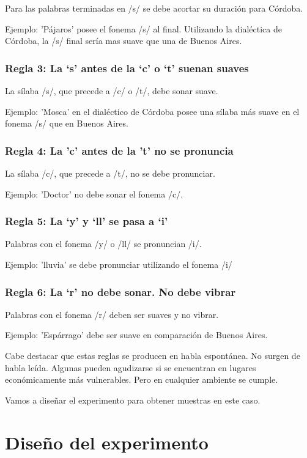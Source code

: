 \documentclass[11pt,a4paper,twoside]{tesis}
\begin{document}
Para las palabras terminadas en /s/ se debe acortar su duración para Córdoba. 

Ejemplo: 'Pájaros' posee el fonema /s/ al final. Utilizando la dialéctica de Córdoba, la /s/ final sería mas suave que una de Buenos Aires. 

\subsection*{Regla 3: La ‘s’ antes de la ‘c’ o ‘t’ suenan suaves}

La sílaba /s/, que precede a /c/ o /t/, debe sonar suave. 

Ejemplo: 'Mosca' en el dialéctico de Córdoba posee una sílaba más suave en el fonema /s/ que en Buenos Aires. 

\subsection*{Regla 4: La 'c' antes de la 't' no se pronuncia}

La sílaba /c/, que precede a /t/, no se debe pronunciar. 

Ejemplo: 'Doctor' no debe sonar el fonema /c/.

\subsection*{Regla 5: La ‘y’ y ‘ll’ se pasa a ‘i’}

Palabras con el fonema /y/ o /ll/ se pronuncian /i/. 


Ejemplo: 'lluvia' se debe pronunciar utilizando el fonema /i/ 

\subsection*{Regla 6: La ‘r’ no debe sonar. No debe vibrar}

Palabras con el fonema /r/ deben ser suaves y no vibrar. 

Ejemplo: 'Espárrago' debe ser suave en comparación de Buenos Aires. 

Cabe destacar que estas reglas se producen en habla espontánea. No surgen de habla leída. Algunas pueden agudizarse si se encuentran en lugares económicamente más vulnerables. Pero en cualquier ambiente se cumple.

Vamos a diseñar el experimento para obtener muestras en este caso.

\chapter{Diseño del experimento}
\end{document}
